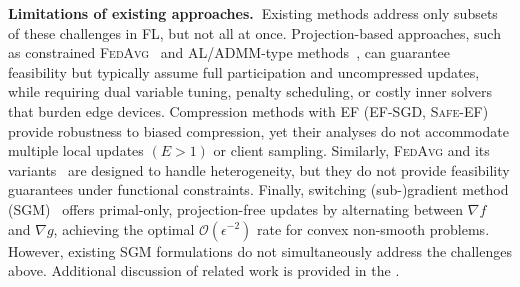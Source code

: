 \documentclass{article} %
\begin{document}
    \textbf{Limitations of existing approaches.\  }Existing methods address only {subsets} of these challenges in FL, but not all at once. Projection-based approaches, such as constrained \textsc{FedAvg}~\citep{he2024federated} and AL/ADMM-type methods~\citep{nemirovski2004prox,hamedani2021primal,muller2024truly,ding2023last,kim2024fast}, can guarantee feasibility but typically assume {full participation} and {uncompressed updates}, while requiring dual variable tuning, penalty scheduling, or costly inner solvers that burden edge devices. Compression methods with EF (\textsc{EF-SGD}, \textsc{Safe-EF})~\citep{stich2019error,alistarh2017qsgd,fatkhullin2021ef21,islamov2025safe} provide robustness to biased compression, yet their analyses do not accommodate multiple local updates $(E>1)$ or client sampling.
    Similarly, \textsc{FedAvg} and its variants~\citep{khaled2019first,karimireddy2020scaffold,li2020federated} are designed to handle heterogeneity, but they do not provide feasibility guarantees under functional constraints. Finally, switching (sub-)gradient method (SGM)~\citep{polyak1967general,lan2020algorithms,upadhyay2025optimization} offers primal-only, projection-free updates by alternating between $\nabla f$ and $\nabla g$, achieving the optimal $\mathcal{O}(\epsilon^{-2})$ rate for convex non-smooth problems. However, existing SGM formulations do not simultaneously address the challenges above. Additional discussion of related work is provided in the .
\end{document}
